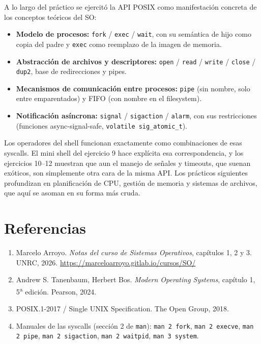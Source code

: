 \documentclass[11pt,a4paper]{article}
\begin{document}
A lo largo del práctico se ejercitó la API POSIX como manifestación
concreta de los conceptos teóricos del SO:

\begin{itemize}[leftmargin=*]
    \item \textbf{Modelo de procesos:} \texttt{fork} / \texttt{exec} /
        \texttt{wait}, con su semántica de hijo como copia del padre y
        \texttt{exec} como reemplazo de la imagen de memoria.
    \item \textbf{Abstracción de archivos y descriptores:}
        \texttt{open} / \texttt{read} / \texttt{write} /
        \texttt{close} / \texttt{dup2}, base de redirecciones y pipes.
    \item \textbf{Mecanismos de comunicación entre procesos:}
        \texttt{pipe} (sin nombre, solo entre emparentados) y FIFO
        (con nombre en el filesystem).
    \item \textbf{Notificación asíncrona:} \texttt{signal} /
        \texttt{sigaction} / \texttt{alarm}, con sus restricciones
        (funciones async-signal-safe, \texttt{volatile
        sig\_atomic\_t}).
\end{itemize}

Los operadores del shell funcionan exactamente como combinaciones de
esas syscalls. El mini shell del ejercicio 9 hace explícita esa
correspondencia, y los ejercicios 10--12 muestran que aun el manejo de
señales y timeouts, que suenan exóticos, son simplemente otra cara de
la misma API. Los prácticos siguientes profundizan en planificación de
CPU, gestión de memoria y sistemas de archivos, que aquí se asoman en
su forma más cruda.

\section*{Referencias}

\begin{enumerate}[leftmargin=*]
    \item Marcelo Arroyo. \emph{Notas del curso de Sistemas
        Operativos}, capítulos 1, 2 y 3. UNRC, 2026.
        \url{https://marceloarroyo.gitlab.io/cursos/SO/}
    \item Andrew S. Tanenbaum, Herbert Bos. \emph{Modern Operating
        Systems}, capítulo 1, 5\textsuperscript{a} edición. Pearson,
        2024.
    \item POSIX.1-2017 / Single UNIX Specification. The Open Group,
        2018.
    \item Manuales de las syscalls (sección 2 de \texttt{man}):
        \texttt{man 2 fork}, \texttt{man 2 execve},
        \texttt{man 2 pipe}, \texttt{man 2 sigaction},
        \texttt{man 2 waitpid}, \texttt{man 3 system}.
\end{enumerate}
\end{document}
